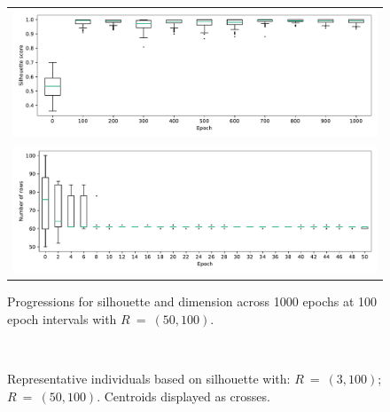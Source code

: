 \documentclass[smallextended]{svjour3}
\newlength{\imgwidth}
\begin{document}
\begin{figure}
    \ContinuedFloat%
    \centering
    \begin{tabular}{c}
        \includegraphics[width=\imgwidth]{Fig9b-1.pdf}
        \\
        \includegraphics[width=\imgwidth]{Fig9b-2.pdf}
    \end{tabular}
    \caption{%
        Progressions for silhouette and dimension across 1000 epochs at 100
        epoch intervals with \(R~=~(50,100)\).
    }\label{fig:large-silhouette}
\end{figure}

\begin{figure}[htbp]
    \centering
    \\

    \caption[]{%
        Representative individuals based on silhouette with:
         \(R~=~(3,100)\);
         \(R~=~(50,100)\). Centroids displayed
        as crosses.
    }\label{fig:silhouette-inds}
\end{figure}
\end{document}
